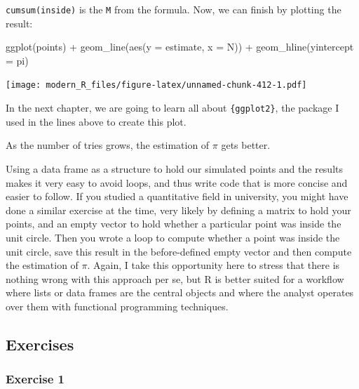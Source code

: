 \documentclass[
]{article}
\newenvironment{Shaded}{\begin{snugshade}}{\end{snugshade}}
\newcommand{\AttributeTok}[1]{\textcolor[rgb]{0.77,0.63,0.00}{#1}}
\newcommand{\FunctionTok}[1]{\textcolor[rgb]{0.00,0.00,0.00}{#1}}
\newcommand{\NormalTok}[1]{#1}
\newcommand{\SpecialCharTok}[1]{\textcolor[rgb]{0.00,0.00,0.00}{#1}}
\begin{document}
\texttt{cumsum(inside)} is the \texttt{M} from the formula. Now, we can finish by plotting the result:

\begin{Shaded}
\begin{Highlighting}[]
\FunctionTok{ggplot}\NormalTok{(points) }\SpecialCharTok{+}
    \FunctionTok{geom\_line}\NormalTok{(}\FunctionTok{aes}\NormalTok{(}\AttributeTok{y =}\NormalTok{ estimate, }\AttributeTok{x =}\NormalTok{ N)) }\SpecialCharTok{+}
    \FunctionTok{geom\_hline}\NormalTok{(}\AttributeTok{yintercept =}\NormalTok{ pi)}
\end{Highlighting}
\end{Shaded}

\texttt{[image: modern\_R\_files/figure-latex/unnamed-chunk-412-1.pdf]}

In the next chapter, we are going to learn all about \texttt{\{ggplot2\}}, the package I used in the lines
above to create this plot.

As the number of tries grows, the estimation of \(\pi\) gets better.

Using a data frame as a structure to hold our simulated points and the results makes it very easy
to avoid loops, and thus write code that is more concise and easier to follow.
If you studied a quantitative field in university, you might have done a similar exercise at the
time, very likely by defining a matrix to hold your points, and an empty vector to hold whether a
particular point was inside the unit circle. Then you wrote a loop to compute whether
a point was inside the unit circle, save this result in the before-defined empty vector and then
compute the estimation of \(\pi\). Again, I take this opportunity here to stress that there is nothing
wrong with this approach per se, but R is better suited for a workflow where lists or data frames
are the central objects and where the analyst operates over them with functional programming techniques.

\hypertarget{exercises-2}{%
\subsection{Exercises}\label{exercises-2}}

\hypertarget{exercise-1-2}{%
\subsubsection*{Exercise 1}\label{exercise-1-2}}
\end{document}
